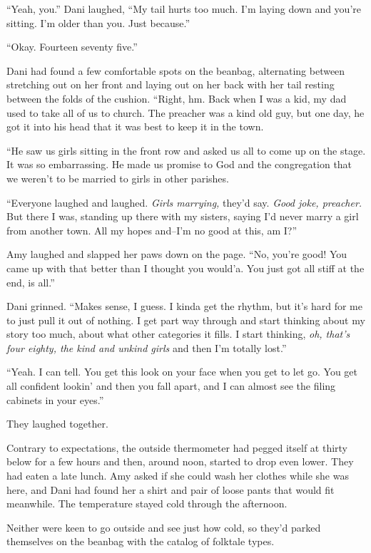 ``Yeah, you.'' Dani laughed, ``My tail hurts too much. I'm laying down and you're sitting. I'm older than you. Just because.''

\secdiv

``Okay. Fourteen seventy five.''

Dani had found a few comfortable spots on the beanbag, alternating between stretching out on her front and laying out on her back with her tail resting between the folds of the cushion. ``Right, hm. Back when I was a kid, my dad used to take all of us to church. The preacher was a kind old guy, but one day, he got it into his head that it was best to keep it in the town.

``He saw us girls sitting in the front row and asked us all to come up on the stage. It was so embarrassing. He made us promise to God and the congregation that we weren't to be married to girls in other parishes.

``Everyone laughed and laughed. \emph{Girls marrying,} they'd say. \emph{Good joke, preacher.} But there I was, standing up there with my sisters, saying I'd never marry a girl from another town. All my hopes and--I'm no good at this, am I?''

Amy laughed and slapped her paws down on the page. ``No, you're good! You came up with that better than I thought you would'a. You just got all stiff at the end, is all.''

Dani grinned. ``Makes sense, I guess. I kinda get the rhythm, but it's hard for me to just pull it out of nothing. I get part way through and start thinking about my story too much, about what other categories it fills. I start thinking, \emph{oh, that's four eighty, the kind and unkind girls} and then I'm totally lost.''

``Yeah. I can tell. You get this look on your face when you get to let go. You get all confident lookin' and then you fall apart, and I can almost see the filing cabinets in your eyes.''

They laughed together.

Contrary to expectations, the outside thermometer had pegged itself at thirty below for a few hours and then, around noon, started to drop even lower. They had eaten a late lunch. Amy asked if she could wash her clothes while she was here, and Dani had found her a shirt and pair of loose pants that would fit meanwhile. The temperature stayed cold through the afternoon.

Neither were keen to go outside and see just how cold, so they'd parked themselves on the beanbag with the catalog of folktale types.


